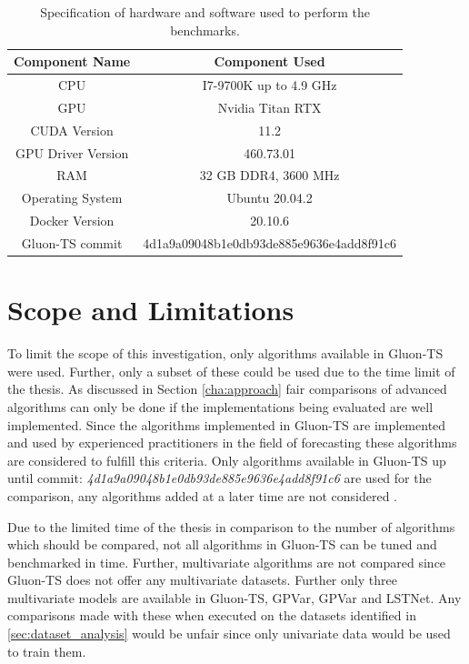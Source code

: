 \begin{table}[htb]
  \centering
  \begin{tabular}{cc}
    \hline
    Component Name     & Component Used                           \\[0.5ex]
    \hline
    CPU                & I7-9700K up to 4.9 GHz                   \\
    GPU                & Nvidia Titan RTX                         \\
    CUDA Version       & 11.2                                     \\
    GPU Driver Version & 460.73.01                                \\
    RAM                & 32 GB DDR4, 3600 MHz                     \\
    Operating System   & Ubuntu 20.04.2                           \\
    Docker Version     & 20.10.6                                  \\
    Gluon-TS commit    & 4d1a9a09048b1e0db93de885e9636e4add8f91c6 \\
  \end{tabular}
  \caption{Specification of hardware and software used to perform the benchmarks.}
  \label{tab:sys_spec}
\end{table}

\section{Scope and Limitations}
\label{sec:empirical_scope}
To limit the scope of this investigation, only algorithms available in Gluon-TS were used. Further, only a subset of these could be used due to the time limit of the thesis. As discussed in Section \ref{cha:approach} fair comparisons of advanced algorithms can only be done if the implementations being evaluated are well implemented. Since the algorithms implemented in Gluon-TS are implemented and used by experienced practitioners in the field of forecasting these algorithms are considered to fulfill this criteria. Only algorithms available in Gluon-TS up until commit: \textit{4d1a9a09048b1e0db93de885e9636e4add8f91c6} are used for the comparison, any algorithms added at a later time are not considered \cite{gluonts-github}.

Due to the limited time of the thesis in comparison to the number of algorithms which should be compared, not all algorithms in Gluon-TS can be tuned and benchmarked in time. Further, multivariate algorithms are not compared since Gluon-TS does not offer any multivariate datasets. Further only three multivariate models are available in Gluon-TS, GPVar, GPVar and LSTNet. Any comparisons made with these when executed on the datasets identified in \ref{sec:dataset_analysis} would be unfair since only univariate data would be used to train them.

